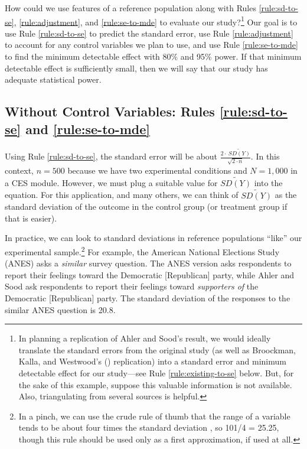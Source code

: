 \documentclass[12pt]{article}
\begin{document}
How could we use features of a reference population along with Rules \ref{rule:sd-to-se}, \ref{rule:adjustment}, and \ref{rule:se-to-mde} to evaluate our study?\footnote{
  In planning a replication of Ahler and Sood's result, we would ideally translate the standard errors from the original study (as well as Broockman, Kalla, and Westwood's (\citeyear{Broockman2022}) replication) into a standard error and minimum detectable effect for our study---see Rule \ref{rule:existing-to-se} below. 
  But, for the sake of this example, suppose this valuable information is not available.
  Also, triangulating from several sources is helpful.} 
Our goal is to use Rule \ref{rule:sd-to-se} to predict the standard error, use Rule \ref{rule:adjustment} to account for any control variables we plan to use, and use Rule \ref{rule:se-to-mde} to find the minimum detectable effect with 80\% and 95\% power. 
If that minimum detectable effect is sufficiently small, then we will say that our study has adequate statistical power.

\subsection*{Without Control Variables: Rules \ref{rule:sd-to-se} and \ref{rule:se-to-mde}}

Using Rule \ref{rule:sd-to-se}, the standard error will be about $\frac{2 \cdot \ \widetilde{SD(Y)}}{\sqrt{2 \cdot n}}$. 
In this context, $n = 500$ because we have two experimental conditions and $N = 1,000$ in a CES module. 
However, we must plug a suitable value for $\widetilde{SD(Y)}$ into the equation. For this application, and many others, we can think of $\widetilde{SD(Y)}$ as the standard deviation of the outcome in the control group (or treatment group if that is easier).

In practice, we can look to standard deviations in reference populations ``like'' our experimental sample.\footnote{In a pinch, we can use the crude rule of thumb that the range of a variable tends to be about four times the standard deviation \citep{Wan2014}, so 101/4 = 25.25, though this rule should be used only as a first approximation, if used at all.} 
For example, the American National Elections Study (ANES) asks a \emph{similar} survey question. 
The ANES version asks respondents to report their feelings toward the Democratic [Republican] party, while Ahler and Sood ask respondents to report their feelings toward \emph{supporters of} the Democratic [Republican] party. 
The standard deviation of the responses to the similar ANES question is 20.8.
\end{document}
